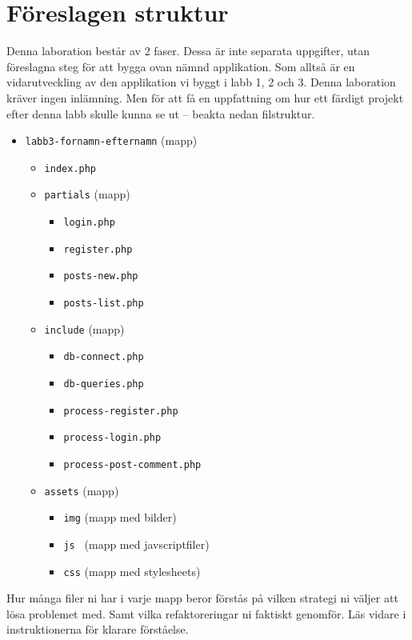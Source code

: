 \documentclass[12pt]{article}
\begin{document}
\section{Föreslagen struktur}
Denna laboration består av 2 faser. Dessa är inte separata uppgifter, utan föreslagna steg för att bygga ovan nämnd applikation. Som alltså är en vidarutveckling av den applikation vi byggt i labb 1, 2 och 3. Denna laboration kräver ingen inlämning. Men för att få en uppfattning om hur ett färdigt projekt efter denna labb skulle kunna se ut -- beakta nedan filstruktur.
\begin{itemize}
  \item \texttt{labb3-fornamn-efternamn} (mapp)
  \begin{itemize}
    \item \texttt{index.php}
    \item \texttt{partials} (mapp)
      \begin{itemize}
        \item \texttt{login.php}
        \item \texttt{register.php}
        \item \texttt{posts-new.php}
        \item \texttt{posts-list.php}
      \end{itemize}
    \item \texttt{include} (mapp)
      \begin{itemize}
        \item \texttt{db-connect.php}
        \item \texttt{db-queries.php}
        \item \texttt{process-register.php}
        \item \texttt{process-login.php}
        \item \texttt{process-post-comment.php}
      \end{itemize}
    \item \texttt{assets} (mapp)
    \begin{itemize}
      \item \texttt{img} (mapp med bilder)
      \item \texttt{js } (mapp med javscriptfiler)
      \item \texttt{css} (mapp med stylesheets)
    \end{itemize}
  \end{itemize}
\end{itemize}

Hur många filer ni har i varje mapp beror förstås på vilken strategi ni väljer att lösa problemet med. Samt vilka refaktoreringar ni faktiskt genomför. Läs vidare i instruktionerna för klarare förståelse.
\end{document}

